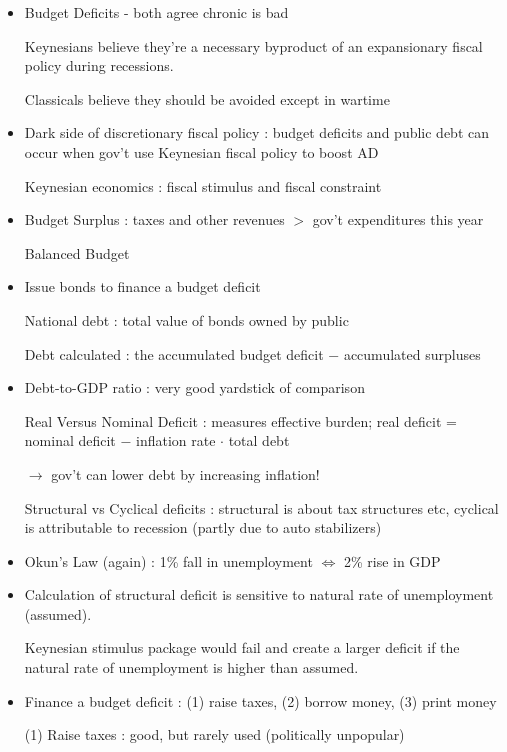 \documentclass{article}
\begin{document}
\newpage
{}
\begin{itemize}
\item Budget Deficits - both agree chronic is bad

Keynesians believe they're a necessary byproduct of an expansionary fiscal policy during recessions.

Classicals believe they should be avoided except in wartime

\item Dark side of discretionary fiscal policy : budget deficits and public debt can occur when gov't use Keynesian fiscal policy to boost AD

Keynesian economics : fiscal stimulus and fiscal constraint

\item Budget Surplus : taxes and other revenues $>$ gov't expenditures this year

Balanced Budget

\item Issue {\color{red} bonds} to finance a budget deficit

National debt : total value of bonds owned by public

Debt calculated : the accumulated budget deficit $-$ accumulated surpluses

\item Debt-to-GDP ratio : very good yardstick of comparison

Real Versus Nominal Deficit : measures effective burden; real deficit = nominal deficit $-$ inflation rate $\cdot$ total debt

$\rightarrow$ gov't can lower debt by increasing inflation!

Structural vs Cyclical deficits : structural is about tax structures etc, cyclical is attributable to recession (partly due to auto stabilizers)

\item Okun's Law (again) : 1\% fall in unemployment $\iff$ 2\% rise in GDP
\item Calculation of structural deficit is sensitive to natural rate of unemployment (assumed).

Keynesian stimulus package would fail and create a larger deficit if the natural rate of unemployment is higher than assumed.

\item Finance a budget deficit : (1) raise taxes, (2) borrow money, (3) print money

(1) Raise taxes : good, but rarely used (politically unpopular)


\end{itemize}
\end{document}
